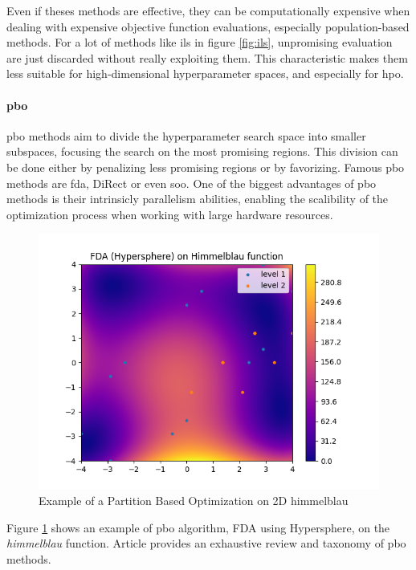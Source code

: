 Even if theses methods are effective, they can be computationally expensive when dealing with expensive objective function evaluations, especially population-based methods. For a lot of methods like \acrshort{ils} in figure \ref{fig:ils}, unpromising evaluation are just discarded without really exploiting them. This characteristic makes them less suitable for high-dimensional hyperparameter spaces, and especially for \acrshort{hpo}.

\paragraph{\acrfull{pbo}}  

\acrfull{pbo} methods aim to divide the hyperparameter search space into smaller subspaces, focusing the search on the most promising regions. This division can be done either by penalizing less promising regions or by favorizing. Famous \acrshort{pbo} methods are \acrfull{fda}\cite{nakib_deterministic_2017}, DiRect \cite{jones_lipschitzian_1993} or even \acrfull{soo}\cite{munos_optimistic_2011}. One of the biggest advantages of \acrshort{pbo} methods is their intrinsicly parallelism abilities, enabling the scalibility of the optimization process when working with large hardware resources.

\begin{figure}[h]
    \centering
    \includegraphics[width=0.5\linewidth]{assets/img/chap_2/plots/fda.png}
    \caption{Example of a Partition Based Optimization on 2D himmelblau}
    \label{fig:pbo}
\end{figure}

Figure \ref{fig:pbo} shows an example of \acrshort{pbo} algorithm, FDA using Hypersphere, on the \textit{himmelblau} function. Article \cite{firmin_comparative_2023} provides an exhaustive review and taxonomy of \acrshort{pbo} methods.


